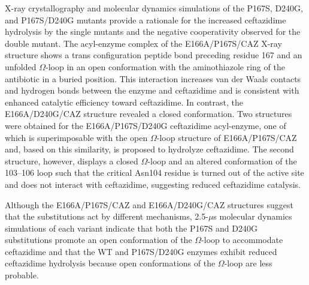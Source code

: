 \documentclass[../main.tex]{subfiles}
\begin{document}
        X-ray crystallography and molecular dynamics simulations of the P167S, D240G, and P167S/D240G mutants provide a rationale for the increased ceftazidime hydrolysis by the single mutants and the negative cooperativity observed for the double mutant. The acyl-enzyme complex of the E166A/P167S/CAZ X-ray structure shows a trans configuration peptide bond preceding residue 167 and an unfolded $\Omega$-loop in an open conformation with the aminothiazole ring of the antibiotic in a buried position. This interaction increases van der Waals contacts and hydrogen bonds between the enzyme and ceftazidime and is consistent with enhanced catalytic efficiency toward ceftazidime. In contrast, the E166A/D240G/CAZ structure revealed a closed conformation. Two structures were obtained for the E166A/P167S/D240G ceftazidime acyl-enzyme, one of which is superimposable with the open $\Omega$-loop structure of E166A/P167S/CAZ and, based on this similarity, is proposed to hydrolyze ceftazidime. The second structure, however, displays a closed $\Omega$-loop and an altered conformation of the 103–106 loop such that the critical Asn104 residue is turned out of the active site and does not interact with ceftazidime, suggesting reduced ceftazidime catalysis.

        Although the E166A/P167S/CAZ and E166A/D240G/CAZ structures suggest that the substitutions act by different mechanisms, 2.5-$\mu$s molecular dynamics simulations of each variant indicate that both the P167S and D240G substitutions promote an open conformation of the $\Omega$-loop to accommodate ceftazidime and that the WT and P167S/D240G enzymes exhibit reduced ceftazidime hydrolysis because open conformations of the $\Omega$-loop are less probable.
\end{document}
